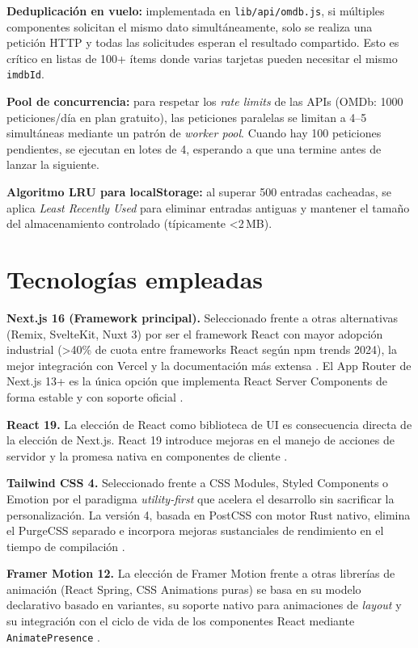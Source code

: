 \textbf{Deduplicación en vuelo:} implementada en \texttt{lib/api/omdb.js}, si múltiples componentes solicitan el mismo dato simultáneamente, solo se realiza una petición HTTP y todas las solicitudes esperan el resultado compartido. Esto es crítico en listas de 100+ ítems donde varias tarjetas pueden necesitar el mismo \texttt{imdbId}.

\textbf{Pool de concurrencia:} para respetar los \textit{rate limits} de las APIs (OMDb: 1000 peticiones/día en plan gratuito), las peticiones paralelas se limitan a 4--5 simultáneas mediante un patrón de \textit{worker pool}. Cuando hay 100 peticiones pendientes, se ejecutan en lotes de 4, esperando a que una termine antes de lanzar la siguiente.

\textbf{Algoritmo LRU para localStorage:} al superar 500 entradas cacheadas, se aplica \textit{Least Recently Used} para eliminar entradas antiguas y mantener el tamaño del almacenamiento controlado (típicamente <2\,MB).

\section{Tecnologías empleadas}

\textbf{Next.js 16 (Framework principal).} Seleccionado frente a otras alternativas (Remix, SvelteKit, Nuxt 3) por ser el framework React con mayor adopción industrial (>40\% de cuota entre frameworks React según npm trends 2024), la mejor integración con Vercel y la documentación más extensa \parencite{Wieruch:2023}. El App Router de Next.js 13+ es la única opción que implementa React Server Components de forma estable y con soporte oficial \parencite{Vercel:2024a,Meta:2024}.

\textbf{React 19.} La elección de React como biblioteca de UI es consecuencia directa de la elección de Next.js. React 19 introduce mejoras en el manejo de acciones de servidor y la promesa nativa en componentes de cliente \parencite{React:2024}.

\textbf{Tailwind CSS 4.} Seleccionado frente a CSS Modules, Styled Components o Emotion por el paradigma \textit{utility-first} que acelera el desarrollo sin sacrificar la personalización. La versión 4, basada en PostCSS con motor Rust nativo, elimina el PurgeCSS separado e incorpora mejoras sustanciales de rendimiento en el tiempo de compilación \parencite{TailwindCSS:2024}.

\textbf{Framer Motion 12.} La elección de Framer Motion frente a otras librerías de animación (React Spring, CSS Animations puras) se basa en su modelo declarativo basado en variantes, su soporte nativo para animaciones de \textit{layout} y su integración con el ciclo de vida de los componentes React mediante \texttt{AnimatePresence} \parencite{Framer:2024}.

